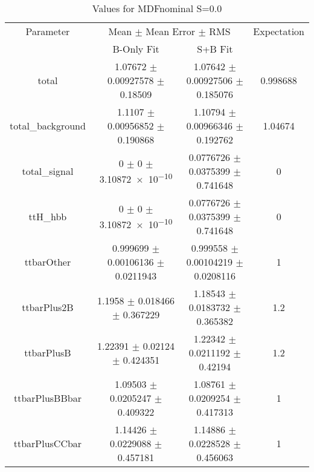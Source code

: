 \begin{table}
\centering
\caption{Values for MDFnominal S=0.0}
\begin{tabular}{cccc}
\toprule
Parameter & \multicolumn{2}{c}{Mean $\pm$ Mean Error $\pm$ RMS} & Expectation\\
 & B-Only Fit & S+B Fit & \\
\midrule
total & \num{1.07672} $\pm$ \num{0.00927578} $\pm$ \num{0.18509} & \num{1.07642} $\pm$ \num{0.00927506} $\pm$ \num{0.185076} & \num{0.998688}\\
total\_background & \num{1.1107} $\pm$ \num{0.00956852} $\pm$ \num{0.190868} & \num{1.10794} $\pm$ \num{0.00966346} $\pm$ \num{0.192762} & \num{1.04674}\\
total\_signal & \num{0} $\pm$ \num{0} $\pm$ \num{3.10872e-10} & \num{0.0776726} $\pm$ \num{0.0375399} $\pm$ \num{0.741648} & \num{0}\\
ttH\_hbb & \num{0} $\pm$ \num{0} $\pm$ \num{3.10872e-10} & \num{0.0776726} $\pm$ \num{0.0375399} $\pm$ \num{0.741648} & \num{0}\\
ttbarOther & \num{0.999699} $\pm$ \num{0.00106136} $\pm$ \num{0.0211943} & \num{0.999558} $\pm$ \num{0.00104219} $\pm$ \num{0.0208116} & \num{1}\\
ttbarPlus2B & \num{1.1958} $\pm$ \num{0.018466} $\pm$ \num{0.367229} & \num{1.18543} $\pm$ \num{0.0183732} $\pm$ \num{0.365382} & \num{1.2}\\
ttbarPlusB & \num{1.22391} $\pm$ \num{0.02124} $\pm$ \num{0.424351} & \num{1.22342} $\pm$ \num{0.0211192} $\pm$ \num{0.42194} & \num{1.2}\\
ttbarPlusBBbar & \num{1.09503} $\pm$ \num{0.0205247} $\pm$ \num{0.409322} & \num{1.08761} $\pm$ \num{0.0209254} $\pm$ \num{0.417313} & \num{1}\\
ttbarPlusCCbar & \num{1.14426} $\pm$ \num{0.0229088} $\pm$ \num{0.457181} & \num{1.14886} $\pm$ \num{0.0228528} $\pm$ \num{0.456063} & \num{1}\\
\bottomrule
\end{tabular}
\end{table}